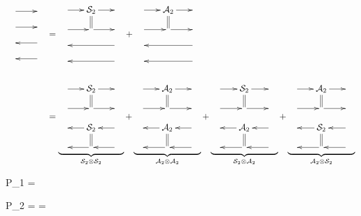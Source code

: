 \begin{align}
\bcen
\xymatrix@R=1pc{
\ar[r]&
\\
\ar[r]&
\\
&\ar[l]
\\
&\ar[l]
}
\ecen
&=
\bcen
\xymatrix@R=1pc@C=1.5pc{
\ar[r]&\cals_2
\ar@2{-}[d]\ar[r]&
\\
\ar[r]&\ar[r]&
\\
&&\ar[ll]
\\
&&\ar[ll]
}
\ecen
+
\bcen
\xymatrix@R=1pc@C=1.5pc{
\ar[r]&\cala_2
\ar@2{-}[d]\ar[r]&
\\
\ar[r]&\ar[r]&
\\
&&\ar[ll]
\\
&&\ar[ll]
}
\ecen
\\
\\
&=
\underbrace{\bcen
\xymatrix@R=1pc@C=1.5pc{
\ar[r]&\cals_2
\ar@2{-}[d]\ar[r]&
\\
\ar[r]&\ar[r]&
\\
&\cals_2\ar[l]
\ar@2{-}[d]&\ar[l]
\\
&\ar[l]&\ar[l]
}
\ecen}_{\cals_2\otimes\cals_2}
+
\underbrace{\bcen
\xymatrix@R=1pc@C=1.5pc{
\ar[r]&\cala_2
\ar@2{-}[d]\ar[r]&
\\
\ar[r]&\ar[r]&
\\
&\cala_2\ar[l]
\ar@2{-}[d]&\ar[l]
\\
&\ar[l]&\ar[l]
}
\ecen}_{\cala_2\otimes\cala_2}
+
\underbrace{\bcen
\xymatrix@R=1pc@C=1.5pc{
\ar[r]&\cals_2
\ar@2{-}[d]\ar[r]&
\\
\ar[r]&\ar[r]&
\\
&\cala_2\ar[l]
\ar@2{-}[d]&\ar[l]
\\
&\ar[l]&\ar[l]
}
\ecen}_{\cals_2\otimes\cala_2}
+
\underbrace{\bcen
\xymatrix@R=1pc@C=1.5pc{
\ar[r]&\cala_2
\ar@2{-}[d]\ar[r]&
\\
\ar[r]&\ar[r]&
\\
&\cals_2\ar[l]
\ar@2{-}[d]&\ar[l]
\\
&\ar[l]&\ar[l]
}
\ecen}_{\cala_2\otimes\cals_2}
\end{align}

\beq
P_1 =
\bcen
{}
\ecen
\eeq

\beq
P_2 =
\bcen
{}
\ecen
=
\bcen
{}
\ecen
\eeq


